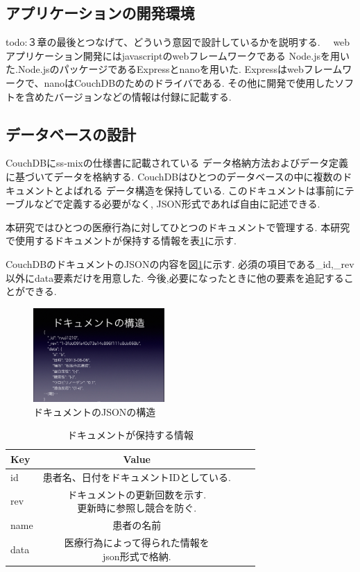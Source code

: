 \subsection{アプリケーションの開発環境}
	todo:３章の最後とつなげて、どういう意図で設計しているかを説明する.
　webアプリケーション開発にはjavascriptのwebフレームワークである
Node.jsを用いた.Node.jsのパッケージであるExpressとnanoを用いた.
Expressはwebフレームワークで、nanoはCouchDBのためのドライバである.
その他に開発で使用したソフトを含めたバージョンなどの情報は付録に記載する.


\subsection{データベースの設計}
	CouchDBにss-mixの仕様書に記載されている
	データ格納方法およびデータ定義\cite{bibi1}に基づいてデータを格納する.
	CouchDBはひとつのデータベースの中に複数のドキュメントとよばれる
	データ構造を保持している.
	このドキュメントは事前にテーブルなどで定義する必要がなく,
	JSON形式であれば自由に記述できる.

	本研究ではひとつの医療行為に対してひとつのドキュメントで管理する.
	本研究で使用するドキュメントが保持する情報を表\ref{tab:doc}に示す.

	CouchDBのドキュメントのJSONの内容を図\ref{json-for-doc}に示す.
	必須の項目である\_id,\_rev以外にdata要素だけを用意した.
	今後,必要になったときに他の要素を追記することができる.
	\\

	\begin{figure}[htbp]
			\includegraphics[width=5cm, bb=0 0 437 688]{./gazou/json-for-doc.png}
		\caption{ドキュメントのJSONの構造}
		\label{json-for-doc}
	\end{figure}


	\begin{table}[htb]
		\begin{center}
			\caption{ドキュメントが保持する情報}
			\begin{tabular}{|l|c|r|r|}\hline
			Key & Value \\ \hline \hline
			id &  患者名、日付をドキュメントIDとしている. \\ \hline
			rev & \shortstack{ドキュメントの更新回数を示す. \\ 更新時に参照し競合を防ぐ.} \\ \hline
			name & 患者の名前 \\ \hline
			data & \shortstack{医療行為によって得られた情報を \\ json形式で格納.} \\ \hline
			\end{tabular}
			\label{tab:doc}
		\end{center}
	\end{table}


